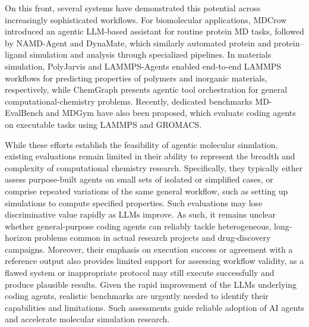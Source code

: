 On this front, several systems have demonstrated this potential across increasingly sophisticated workflows. For biomolecular applications, MDCrow\cite{campbell2026mdcrow} introduced an agentic LLM-based assistant for routine protein MD tasks, followed by NAMD-Agent\cite{chandrasekhar2025namdagent} and DynaMate,\cite{guilbert2025dynamate} which similarly automated protein and protein–ligand simulation and analysis through specialized pipelines. In materials simulation, PolyJarvis\cite{zhao2026polyjarvis} and LAMMPS-Agents\cite{vriza2026multiagentic} enabled end-to-end LAMMPS\cite{thompson2022lammps} workflows for predicting properties of polymers and inorganic materials, respectively, while ChemGraph\cite{pham2026chemgraph} presents agentic tool orchestration for general computational-chemistry problems. Recently, dedicated benchmarks MD-EvalBench\cite{shi2026mdagent2} and MDGym\cite{kumar2026mdgym} have also been proposed, which evaluate coding agents on executable tasks using LAMMPS\cite{thompson2022lammps} and GROMACS.\cite{abraham2015gromacs} 

While these efforts establish the feasibility of agentic molecular simulation, existing evaluations remain limited in their ability to represent the breadth and complexity of computational chemistry research. Specifically, they typically either assess purpose-built agents on small sets of isolated or simplified cases, or comprise repeated variations of the same general workflow, such as setting up simulations to compute specified properties.\cite{kumar2026mdgym} Such evaluations may lose discriminative value rapidly as LLMs improve. As such, it remains unclear whether general-purpose coding agents can reliably tackle heterogeneous, long-horizon problems common in actual research projects and drug-discovery campaigns. Moreover, their emphasis on execution success or agreement with a reference output also provides limited support for assessing workflow validity, as a flawed system or inappropriate protocol may still execute successfully and produce plausible results. Given the rapid improvement of the LLMs underlying coding agents, realistic benchmarks are urgently needed to identify their capabilities and limitations. Such assessments guide reliable adoption of AI agents and accelerate molecular simulation research.

